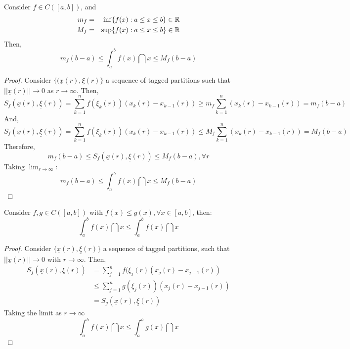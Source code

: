 \begin{theorem}
    Consider $f \in C([a,b])$, and
    \begin{eqnarray*}
        m_f &=& \inf \{ f(x) : a \leq x \leq b \} \in \mathbb{R} \\
        M_f &=& \sup \{ f(x) : a \leq x \leq b \} \in \mathbb{R} \\
    \end{eqnarray*}
    Then,
    \begin{equation*}
        m_f(b-a) \leq \int_a^b f(x)\dint x \leq M_f(b-a)
    \end{equation*}
\end{theorem}

\begin{proof}
    Consider $\{ (\underline{x}(r), \underline{\xi}(r)\}$ a sequence of tagged partitions such that $|| \underline{x}(r) || \to 0$ as $r \to \infty$. Then,
    \begin{equation*}
        S_f(\underline{x}(r), \underline{\xi}(r)) = \sum \limits_{k=1}^n f(\xi_k(r))(x_k(r) - x_{k-1}(r)) \geq m_f \sum \limits_{k=1}^n (x_k(r) - x_{k-1}(r)) = m_f(b-a)
    \end{equation*}
    And,
    \begin{equation*}
        S_f(\underline{x}(r), \underline{\xi}(r)) = \sum \limits_{k=1}^n f(\xi_k(r))(x_k(r) - x_{k-1}(r)) \leq M_f \sum \limits_{k=1}^n (x_k(r) - x_{k-1}(r)) = M_f(b-a)
    \end{equation*}
    Therefore,
    \begin{equation*}
        m_f(b-a) \leq S_f(\underline{x}(r), \underline{\xi}(r)) \leq M_f(b-a), \forall r
    \end{equation*}
    Taking $\lim_{r \to \infty}$:
    \begin{equation*}
        m_f(b-a) \leq \int_a^b f(x) \dint x \leq M_f(b-a)
    \end{equation*}
\end{proof}

\begin{theorem}
    Consider $f, g \in C([a,b])$ with $f(x) \leq g(x), \forall x \in [a,b]$, then:
    \begin{equation*}
        \int_a^b f(x) \dint x \leq \int_a^b f(x) \dint x
    \end{equation*}
\end{theorem}

\begin{proof}
    Consider $\{\underline{x}(r), \underline{\xi}(r)\}$ a sequence of tagged partitions, such that $||\underline{x}(r)|| \to 0$ with $r \to \infty$. Then,
    \begin{align*}
        S_f(\underline{x}(r), \underline{\xi}(r)) &= \sum \limits_{j=1}^n f(\xi_j(r)(x_j(r) - x_{j-1}(r)) \\
        &\leq \sum \limits_{j=1}^n g(\xi_j(r))(x_j(r) - x_{j-1}(r)) \\
        &=S_g(\underline{x}(r), \underline{\xi}(r))
    \end{align*}
    Taking the limit as $r \to \infty$
    \begin{equation*}
        \int_a^b f(x) \dint x \leq \int_a^b g(x) \dint x
    \end{equation*}
\end{proof}


